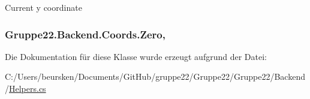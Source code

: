 Current y coordinate 

\hypertarget{class_gruppe22_1_1_backend_1_1_coords_ac2aea2e761ea4b4c95ef1667eb8dfaf8}{
\subsubsection[{Zero}]{ Gruppe22.\-Backend.\-Coords.\-Zero\hspace{0.3cm}{\ttfamily [static]}, {\ttfamily [get]}}}\label{class_gruppe22_1_1_backend_1_1_coords_ac2aea2e761ea4b4c95ef1667eb8dfaf8}


Die Dokumentation für diese Klasse wurde erzeugt aufgrund der Datei\-:\begin{DoxyCompactItemize}
\item 
C\-:/\-Users/beursken/\-Documents/\-Git\-Hub/gruppe22/\-Gruppe22/\-Gruppe22/\-Backend/\hyperlink{_helpers_8cs}{Helpers.\-cs}\end{DoxyCompactItemize}
